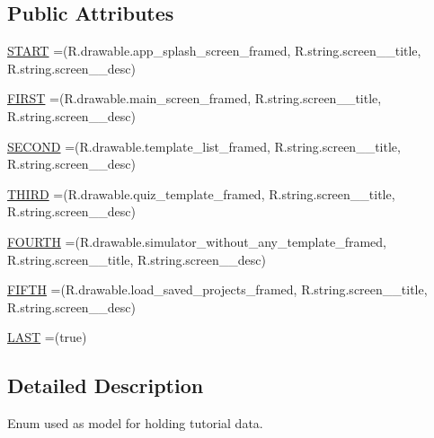\subsection*{Public Attributes}
\begin{DoxyCompactItemize}
\item 
\hyperlink{enumorg_1_1buildmlearn_1_1toolkit_1_1model_1_1Tutorial_a6c371c9b15a236ef851b34eb9b0ffefe}{S\-T\-A\-R\-T} =(R.\-drawable.\-app\-\_\-splash\-\_\-screen\-\_\-framed, R.\-string.\-screen\-\_\-\_\-title, R.\-string.\-screen\-\_\-\_\-desc)
\item 
\hyperlink{enumorg_1_1buildmlearn_1_1toolkit_1_1model_1_1Tutorial_a3b1a4ca35bbdcc35c2d6d7a1c2e87c2a}{F\-I\-R\-S\-T} =(R.\-drawable.\-main\-\_\-screen\-\_\-framed, R.\-string.\-screen\-\_\-\_\-title, R.\-string.\-screen\-\_\-\_\-desc)
\item 
\hyperlink{enumorg_1_1buildmlearn_1_1toolkit_1_1model_1_1Tutorial_a9854ee2b58dff29ba4addee78e4cdb15}{S\-E\-C\-O\-N\-D} =(R.\-drawable.\-template\-\_\-list\-\_\-framed, R.\-string.\-screen\-\_\-\_\-title, R.\-string.\-screen\-\_\-\_\-desc)
\item 
\hyperlink{enumorg_1_1buildmlearn_1_1toolkit_1_1model_1_1Tutorial_a9cc74bacb34a8d3a0c7fa0dbadfc0786}{T\-H\-I\-R\-D} =(R.\-drawable.\-quiz\-\_\-template\-\_\-framed, R.\-string.\-screen\-\_\-\_\-title, R.\-string.\-screen\-\_\-\_\-desc)
\item 
\hyperlink{enumorg_1_1buildmlearn_1_1toolkit_1_1model_1_1Tutorial_ae4478d769431a5f34a6698ca0712ff8f}{F\-O\-U\-R\-T\-H} =(R.\-drawable.\-simulator\-\_\-without\-\_\-any\-\_\-template\-\_\-framed, R.\-string.\-screen\-\_\-\_\-title, R.\-string.\-screen\-\_\-\_\-desc)
\item 
\hyperlink{enumorg_1_1buildmlearn_1_1toolkit_1_1model_1_1Tutorial_abdd038e81834331bf33408c731685847}{F\-I\-F\-T\-H} =(R.\-drawable.\-load\-\_\-saved\-\_\-projects\-\_\-framed, R.\-string.\-screen\-\_\-\_\-title, R.\-string.\-screen\-\_\-\_\-desc)
\item 
\hyperlink{enumorg_1_1buildmlearn_1_1toolkit_1_1model_1_1Tutorial_a911e6c620d9108703ad2317efdc3b659}{L\-A\-S\-T} =(true)
\end{DoxyCompactItemize}


\subsection{Detailed Description}
Enum used as model for holding tutorial data. 

